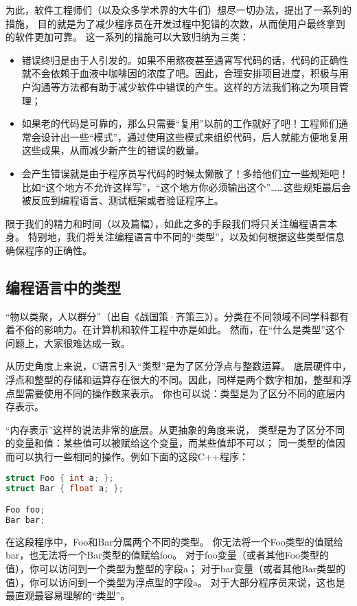 \documentclass[../main.tex]{subfiles}
\begin{document}
  \indent 为此，软件工程师们（以及众多学术界的大牛们）想尽一切办法，提出了一系列的措施，
  目的就是为了减少程序员在开发过程中犯错的次数，从而使用户最终拿到的软件更加可靠。
  这一系列的措施可以大致归纳为三类：\cite{sf}
  \begin{itemize}
    \item 错误终归是由于人引发的。如果不用熬夜甚至通宵写代码的话，代码的正确性就不会依赖于血液中咖啡因的浓度了吧。因此，合理安排项目进度，积极与用户沟通等方法都有助于减少软件中错误的产生。这样的方法我们称之为项目管理；
    \item 如果老的代码是可靠的，那么只需要“复用”以前的工作就好了吧！工程师们通常会设计出一些“模式”，通过使用这些模式来组织代码，后人就能方便地复用这些成果，从而减少新产生的错误的数量。
    \item 会产生错误就是由于程序员写代码的时候太懒散了！多给他们立一些规矩吧！比如“这个地方不允许这样写”，“这个地方你必须输出这个”……这些规矩最后会被反应到编程语言、测试框架或者验证程序上。
  \end{itemize}

  \indent 限于我们的精力和时间（以及篇幅），如此之多的手段我们将只关注编程语言本身。
  特别地，我们将关注编程语言中不同的“类型”，以及如何根据这些类型信息确保程序的正确性。

  \subsection{编程语言中的类型}
  \indent “物以类聚，人以群分”（出自《战国策·齐策三》）。分类在不同领域不同学科都有着不俗的影响力。在计算机和软件工程中亦是如此。
  然而，在“什么是类型”这个问题上，大家很难达成一致。
  
  \indent 从历史角度上来说，C语言引入“类型”是为了区分浮点与整数运算\cite{typeytb}。
  底层硬件中，浮点和整型的存储和运算存在很大的不同。因此，同样是两个数字相加，整型和浮点型需要使用不同的操作数来表示。
  你也可以说：类型是为了区分不同的底层内存表示。

  \indent “内存表示”这样的说法非常的底层。从更抽象的角度来说，
  类型是为了区分不同的变量和值：某些值可以被赋给这个变量，而某些值却不可以；
  同一类型的值因而可以执行一些相同的操作。例如下面的这段C++程序：

\begin{lstlisting}[language=c++]
struct Foo { int a; };
struct Bar { float a; };

Foo foo;
Bar bar;
\end{lstlisting}

  \indent 在这段程序中，Foo和Bar分属两个不同的类型。
  你无法将一个Foo类型的值赋给bar，也无法将一个Bar类型的值赋给foo。
  对于foo变量（或者其他Foo类型的值），你可以访问到一个类型为整型的字段a；
  对于bar变量（或者其他Bar类型的值），你可以访问到一个类型为浮点型的字段a。
  对于大部分程序员来说，这也是最直观最容易理解的“类型”。
\end{document}
